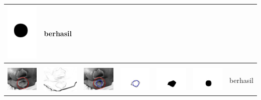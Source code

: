 \begin{table}[H]
\begin{tabular}{|m{0.7in}|m{0.7in}|m{0.7in}|m{0.7in}|m{0.7in}|m{0.7in}|m{0.7in}|}
		\includegraphics[width=0.7in]{dataset/dataset_3/luka_merah/ready/9_integer_r.jpg}&
		berhasil\\
		\hline
		
		&  &  & & & &  \\
		\includegraphics[width=0.7in]{dataset/dataset_3/luka_merah/ready/36_integer_init.jpg}&
		\includegraphics[width=0.7in]{dataset/dataset_3/luka_merah/ready/36_integer_ext.jpg}&
		\includegraphics[width=0.7in]{dataset/dataset_3/luka_merah/ready/36_integer_result.jpg}&
		\includegraphics[width=0.7in]{dataset/dataset_3/luka_merah/ready/36_gt_r_integer.jpg}&
		\includegraphics[width=0.7in]{dataset/dataset_3/luka_merah/ready/36_r.jpg}&
		\includegraphics[width=0.7in]{dataset/dataset_3/luka_merah/ready/36_integer_r.jpg}&
		berhasil\\
		\hline
		

\end{tabular}
\end{table}
